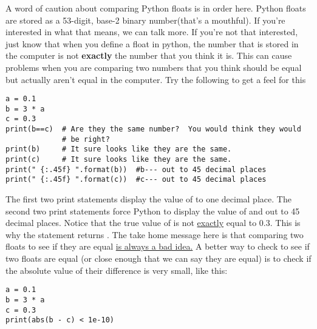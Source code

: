 A word of caution about comparing Python floats is in order here.
Python floats are stored as a 53-digit, base-2 binary number(that's a
mouthful).  If you're interested in what that means, we can talk more.
If you're not that interested, just know that when you define a float
in python, the number that is stored in the computer is not
\textbf{exactly} the number that you think it is.  This can cause
problems when you are comparing two numbers that you think should be
equal but actually aren't equal in the computer.   Try the following to get a feel for this
\begin{Verbatim}
a = 0.1
b = 3 * a
c = 0.3
print(b==c)  # Are they the same number?  You would think they would
             # be right?
print(b)     # It sure looks like they are the same.
print(c)     # It sure looks like they are the same.
print(" {:.45f} ".format(b))  #b--- out to 45 decimal places
print(" {:.45f} ".format(c))  #c--- out to 45 decimal places
\end{Verbatim}
The first two print statements display the value of  to one
decimal place. The second two print statements force Python
to display the value of  and  out to 45 decimal
places.  Notice that the true value of  is not \ul{exactly}
equal to 0.3.  This is why the statement  returns
. The take home message here is that comparing two floats
to see if they are equal \ul{is always a bad idea.}  A better way to
check to see if two floats are equal (or close enough that we can say
they are equal) is to check if the absolute value of their difference
is very small, like this:
\begin{Verbatim}
a = 0.1
b = 3 * a
c = 0.3
print(abs(b - c) < 1e-10)
\end{Verbatim}
